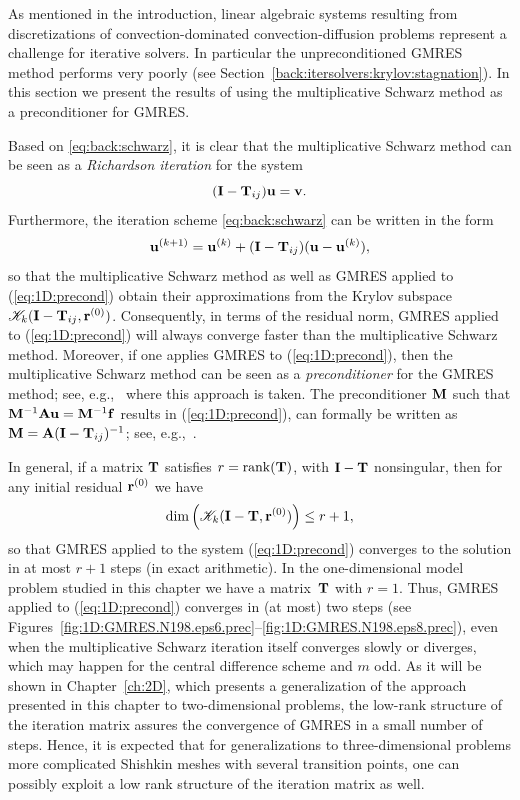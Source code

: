 As mentioned in the introduction, linear algebraic systems resulting from
discretizations of convection-dominated convection-diffusion problems represent
a challenge for iterative solvers. In particular the unpreconditioned GMRES
method performs very poorly
(see Section~\ref{back:itersolvers:krylov:stagnation}).
In this section we present the results of using the multiplicative Schwarz
method as a preconditioner for GMRES.

Based on \eqref{eq:back:schwarz}, it is clear that the multiplicative Schwarz
method can be seen as a {\em Richardson iteration} for the system
\begin{equation}\label{eq:1D:precond}
(\mathbf{I}-\mathbf{T}_{ij})\mathbf{u}=\mathbf{v}.
\end{equation}
Furthermore, the iteration scheme \eqref{eq:back:schwarz} can be written in the form
\begin{equation*}%
\u^{(k+1)}= \u^{(k)} + (\I-\T_{ij}) (\u-\u^{(k)}),
\end{equation*}
so that the multiplicative Schwarz method as well as GMRES applied to
(\ref{eq:1D:precond}) obtain their approximations
from the Krylov subspace $\mathscr{K}_k(\mathbf{I}-\mathbf{T}_{ij},\mathbf{r}^{(0)})$.
Consequently, in terms of the residual norm, GMRES applied to
(\ref{eq:1D:precond}) will always converge faster than the multiplicative
Schwarz method. Moreover, if one applies GMRES to (\ref{eq:1D:precond}), then
the multiplicative Schwarz method can be seen as a \emph{preconditioner}
for the GMRES method; see, e.g.,~\cite{KahKamPhi07} where this approach is
taken. The preconditioner $\mathbf{M}$ such that $\mathbf{M}^{-1}\mathbf{A}\mathbf{u}=\mathbf{M}^{-1}\mathbf{f}$ results in
(\ref{eq:1D:precond}), can formally be written as $\mathbf{M} = \mathbf{A} (\mathbf{I}-\mathbf{T}_{ij})^{-1}$;
see, e.g.,~\cite[Lemma 2.3]{LanRosSzy91}.

In general, if a matrix $\mathbf{T}$ satisfies $r=\mathrm{rank}(\mathbf{T})$, with $\mathbf{I}-\mathbf{T}$
nonsingular, then for any initial residual $\mathbf{r}^{(0)}$ we have
\[\dim \left(\mathscr{K}_k(\mathbf{I}-\mathbf{T},\mathbf{r}^{(0)})\right) \leq r+1,\]
so that GMRES applied to the system (\ref{eq:1D:precond}) converges to the
solution in at most $r+1$ steps (in exact arithmetic). In the one-dimensional
model problem studied in this chapter we have a matrix~$\mathbf{T}$ with $r=1$. Thus,
GMRES applied to (\ref{eq:1D:precond}) converges in (at most) two steps
(see Figures~\ref{fig:1D:GMRES.N198.eps6.prec}--\ref{fig:1D:GMRES.N198.eps8.prec}), even when the multiplicative Schwarz
iteration itself converges slowly or diverges, which may happen for the
central difference scheme and $m$ odd. As it will be shown in
Chapter~\ref{ch:2D}, which presents a generalization of the approach presented
in this chapter to two-dimensional problems, the low-rank structure of the
iteration matrix assures the convergence of GMRES in a small number of steps.
Hence, it is expected that for generalizations to three-dimensional problems
more complicated Shishkin meshes with several transition points, one can
possibly exploit a low rank structure of the iteration matrix as well.

